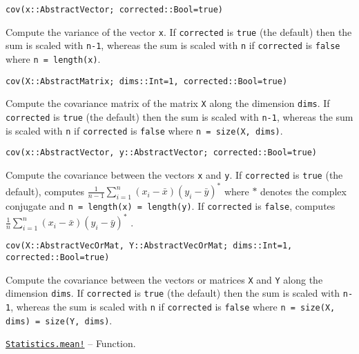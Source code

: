 \begin{adjustwidth}{2em}{0pt}


\begin{verbatim}
cov(x::AbstractVector; corrected::Bool=true)
\end{verbatim}

Compute the variance of the vector \texttt{x}. If \texttt{corrected} is \texttt{true} (the default) then the sum is scaled with \texttt{n-1}, whereas the sum is scaled with \texttt{n} if \texttt{corrected} is \texttt{false} where \texttt{n = length(x)}.




\begin{lstlisting}
cov(X::AbstractMatrix; dims::Int=1, corrected::Bool=true)
\end{lstlisting}

Compute the covariance matrix of the matrix \texttt{X} along the dimension \texttt{dims}. If \texttt{corrected} is \texttt{true} (the default) then the sum is scaled with \texttt{n-1}, whereas the sum is scaled with \texttt{n} if \texttt{corrected} is \texttt{false} where \texttt{n = size(X, dims)}.




\begin{lstlisting}
cov(x::AbstractVector, y::AbstractVector; corrected::Bool=true)
\end{lstlisting}

Compute the covariance between the vectors \texttt{x} and \texttt{y}. If \texttt{corrected} is \texttt{true} (the default), computes  \(\frac{1}{n-1}\sum_{i=1}^n (x_i-\bar x) (y_i-\bar y)^*\)  where  \(*\)  denotes the complex conjugate and \texttt{n = length(x) = length(y)}. If \texttt{corrected} is \texttt{false}, computes  \(\frac{1}{n}\sum_{i=1}^n (x_i-\bar x) (y_i-\bar y)^*\) .




\begin{lstlisting}
cov(X::AbstractVecOrMat, Y::AbstractVecOrMat; dims::Int=1, corrected::Bool=true)
\end{lstlisting}

Compute the covariance between the vectors or matrices \texttt{X} and \texttt{Y} along the dimension \texttt{dims}. If \texttt{corrected} is \texttt{true} (the default) then the sum is scaled with \texttt{n-1}, whereas the sum is scaled with \texttt{n} if \texttt{corrected} is \texttt{false} where \texttt{n = size(X, dims) = size(Y, dims)}.



\end{adjustwidth}
\hypertarget{9852865620009351869}{}
\hyperlink{9852865620009351869}{\texttt{Statistics.mean!}}  -- {Function.}

